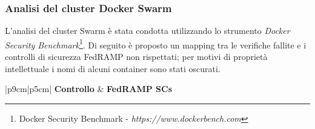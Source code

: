 \documentclass[../main.tex]{subfiles}
\begin{document}
\subsubsection{Analisi del cluster Docker Swarm}
\label{ref:dockerswarmanalysis}
L'analisi del cluster Swarm è stata condotta utilizzando lo strumento \textit{Docker Security Benchmark}\footnote{Docker Security Benchmark - \textit{https://www.dockerbench.com}}.
Di seguito è proposto un mapping tra le verifiche fallite e i controlli di sicurezza FedRAMP non rispettati; per motivi di proprietà intellettuale i nomi di alcuni container sono stati oscurati.
    \begin{ltabulary}{|p{9cm}|p{5cm}|}
        \hline
        \textbf{Controllo} & \textbf{FedRAMP SCs} \\
        \hline
        \endhead


\end{ltabulary}
\end{document}
